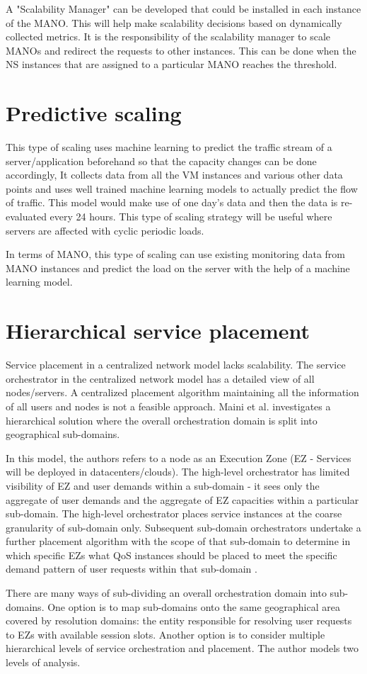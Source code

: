 A "Scalability Manager" can be developed that could be installed in each instance of the MANO. This will help make scalability decisions based on dynamically collected metrics. It is the responsibility of the scalability manager to scale MANOs and redirect the requests to other instances. This can be done when the NS instances that are assigned to a particular MANO reaches the threshold.


\section{Predictive scaling}
This type of scaling uses machine learning to predict the traffic stream of a server/application beforehand so that the capacity changes can be done accordingly, It collects data from all the VM instances and various other data points and uses well trained machine learning models to actually predict the flow of traffic. This model would make use of one day's data and then the data is re-evaluated every 24 hours. This type of scaling strategy will be useful where servers are affected with cyclic periodic loads.

In terms of MANO, this type of scaling can use existing monitoring data from MANO instances and predict the load on the server with the help of a machine learning model.


\section{Hierarchical service placement}

Service placement in a centralized network model lacks scalability. The service orchestrator in the centralized network model has a detailed view of all nodes/servers. A centralized placement algorithm maintaining all the information of all users and nodes is not a feasible approach. Maini et al. \cite{maini_hierarchical_2016} investigates a hierarchical solution where the overall orchestration domain is split into geographical sub-domains.

In this model, the authors refers to a node as an Execution Zone (EZ - Services will be deployed in datacenters/clouds). The high-level orchestrator has limited visibility of EZ and user demands within a sub-domain - it sees only the aggregate of user demands and the aggregate of EZ capacities within a particular sub-domain. The high-level orchestrator places service instances at the coarse granularity of sub-domain only. Subsequent sub-domain orchestrators undertake a further placement algorithm with the scope of that sub-domain to determine in which specific EZs what QoS instances should be placed to meet the specific demand pattern of user requests within that sub-domain \cite{maini_hierarchical_2016}.


There are many ways of sub-dividing an overall orchestration domain into sub-domains. One option is to map sub-domains onto the same geographical area covered by resolution domains: the entity responsible for resolving user requests to EZs with available session slots. Another option is to consider multiple hierarchical levels of service orchestration and placement. The author models two levels of analysis.